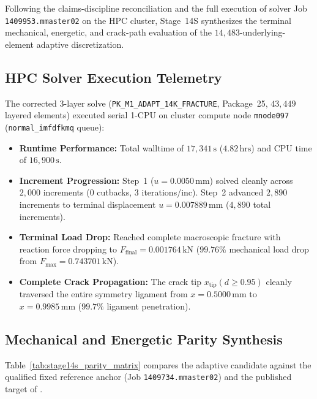 Following the claims-discipline reconciliation and the full execution of solver Job \texttt{1409953.mmaster02} on the HPC cluster, Stage~14S synthesizes the terminal mechanical, energetic, and crack-path evaluation of the $14,483$-underlying-element adaptive discretization.

\subsection{HPC Solver Execution Telemetry}
\label{subsec:stage14s_telemetry}

The corrected $3$-layer solve (\texttt{PK\_M1\_ADAPT\_14K\_FRACTURE}, Package~25, $43,449$ layered elements) executed serial 1-CPU on cluster compute node \texttt{mnode097} (\texttt{normal\_imfdfkmq} queue):
\begin{itemize}
    \item \textbf{Runtime Performance:} Total walltime of $17{,}341\,\mathrm{s}$ ($4.82\,\mathrm{hrs}$) and CPU time of $16{,}900\,\mathrm{s}$.
    \item \textbf{Increment Progression:} Step~1 ($u = 0.0050\,\mathrm{mm}$) solved cleanly across $2{,}000$ increments ($0$ cutbacks, $3$ iterations/inc). Step~2 advanced $2{,}890$ increments to terminal displacement $u = 0.007889\,\mathrm{mm}$ ($4{,}890$ total increments).
    \item \textbf{Terminal Load Drop:} Reached complete macroscopic fracture with reaction force dropping to $F_{\mathrm{final}} = 0.001764\,\mathrm{kN}$ ($99.76\%$ mechanical load drop from $F_{\max} = 0.743701\,\mathrm{kN}$).
    \item \textbf{Complete Crack Propagation:} The crack tip $x_{\mathrm{tip}}(d \ge 0.95)$ cleanly traversed the entire symmetry ligament from $x = 0.5000\,\mathrm{mm}$ to $x = 0.9985\,\mathrm{mm}$ ($99.7\%$ ligament penetration).
\end{itemize}

\subsection{Mechanical and Energetic Parity Synthesis}
\label{subsec:stage14s_parity}

Table~\ref{tab:stage14s_parity_matrix} compares the adaptive candidate against the qualified fixed reference anchor (Job \texttt{1409734.mmaster02}) and the published target of \citet{pandey2025}.

